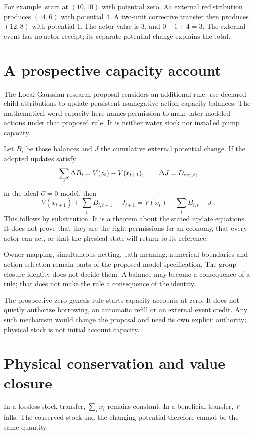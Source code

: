 For example, start at $(10,10)$ with potential zero. An external redistribution produces $(14,6)$ with potential 4. A two-unit corrective transfer then produces $(12,8)$ with potential 1. The actor value is 3, and $0-1+4=3$. The external event has no actor receipt; its separate potential change explains the total.

\section{A prospective capacity account}
The Local Gaussian research proposal considers an additional rule: use declared child attributions to update persistent nonnegative action-capacity balances. The mathematical word capacity here names permission to make later modeled actions under that proposed rule. It is neither water stock nor installed pump capacity.

Let $B_i$ be those balances and $J$ the cumulative external potential change. If the adopted updates satisfy
\[
 \sum_i\Delta B_i=V(z_t)-V(x_{t+1}),\qquad
 \Delta J=D_{{\rm ext},t},
\]
in the ideal $C=0$ model, then
\begin{equation}
 V(x_{t+1})+\sum_iB_{i,t+1}-J_{t+1}
 =V(x_t)+\sum_iB_{i,t}-J_t.
\end{equation}
This follows by substitution. It is a theorem about the stated update equations. It does not prove that they are the right permissions for an economy, that every actor can act, or that the physical state will return to its reference.

Owner mapping, simultaneous netting, path meaning, numerical boundaries and action selection remain parts of the proposed model specification. The group closure identity does not decide them. A balance may become a consequence of a rule; that does not make the rule a consequence of the identity.

The prospective zero-genesis rule starts capacity accounts at zero. It does not quietly authorize borrowing, an automatic refill or an external event credit. Any such mechanism would change the proposal and need its own explicit authority; physical stock is not initial account capacity.

\section{Physical conservation and value closure}
In a lossless stock transfer, $\sum_i x_i$ remains constant. In a beneficial transfer, $V$ falls. The conserved stock and the changing potential therefore cannot be the same quantity.


